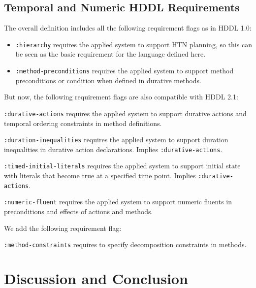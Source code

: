 \documentclass[letterpaper]{article} %
\begin{document}
\subsection{Temporal and Numeric HDDL Requirements}
\label{Sec:Requirements}
The overall definition includes all the following requirement flags as in HDDL 1.0:
\begin{itemize}
 \item \verb+:hierarchy+ requires the applied system to support HTN planning, so this can be seen as the basic requirement for the language defined here.
 \item \verb+:method-preconditions+ requires the applied system to support method preconditions or condition when defined in durative methods.
\end{itemize}
But now, the following requirement flags are also compatible with HDDL 2.1:
\begin{description}
 \item \verb+:durative-actions+ requires the applied system to support durative actions and temporal ordering constraints in method definitions.
 \item \verb+:duration-inequalities+ requires the applied system to support duration inequalities in durative action declarations. Implies \verb+:durative-actions+.
 \item \verb+:timed-initial-literals+ requires the applied system to support initial state with literals that become true at a specified time point. Implies \verb+:durative-actions+.
 \item \verb+:numeric-fluent+ requires the applied system to support numeric fluents in preconditions and effects of actions and methods.
 \end{description}
 We add the following requirement flag:
\begin{description}
\item \verb+:method-constraints+ requires to specify decomposition constraints in methods.
 \end{description}

\section{Discussion and Conclusion}
\label{sec:conclusion}

\end{document}
